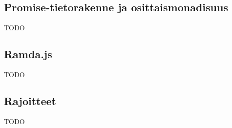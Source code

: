 \subsection{Promise-tietorakenne ja osittaismonadisuus}

TODO





\subsection{Ramda.js}

TODO






\subsection{Rajoitteet}

TODO

